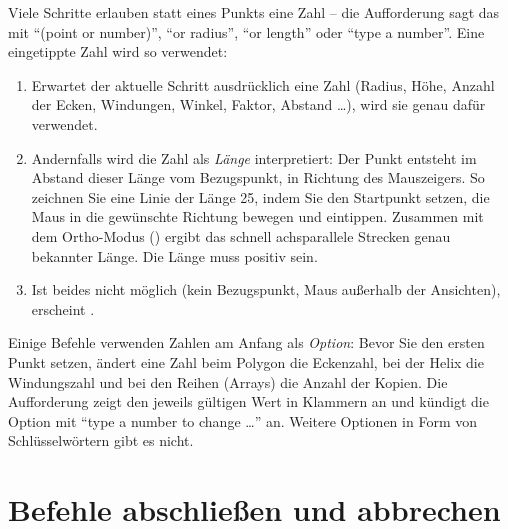 Viele Schritte erlauben statt eines Punkts eine Zahl -- die Aufforderung sagt das mit
\enquote{(point or number)}, \enquote{or radius}, \enquote{or length} oder \enquote{type a
number}. Eine eingetippte Zahl wird so verwendet:

\begin{enumerate}
\item Erwartet der aktuelle Schritt ausdrücklich eine Zahl (Radius, Höhe, Anzahl der Ecken,
  Windungen, Winkel, Faktor, Abstand \ldots), wird sie genau dafür verwendet.
\item Andernfalls wird die Zahl als \emph{Länge} interpretiert: Der Punkt entsteht im Abstand
  dieser Länge vom Bezugspunkt, in Richtung des Mauszeigers. So zeichnen Sie eine Linie der
  Länge 25, indem Sie den Startpunkt setzen, die Maus in die gewünschte Richtung bewegen und
   eintippen. Zusammen mit dem Ortho-Modus () ergibt das schnell achsparallele
  Strecken genau bekannter Länge. Die Länge muss positiv sein.
\item Ist beides nicht möglich (kein Bezugspunkt, Maus außerhalb der Ansichten), erscheint
  .
\end{enumerate}

Einige Befehle verwenden Zahlen am Anfang als \emph{Option}: Bevor Sie den ersten Punkt setzen,
ändert eine Zahl beim Polygon die Eckenzahl, bei der Helix die Windungszahl und bei den Reihen
(Arrays) die Anzahl der Kopien. Die Aufforderung zeigt den jeweils gültigen Wert in Klammern an
und kündigt die Option mit \enquote{type a number to change \ldots} an. Weitere Optionen in
Form von Schlüsselwörtern gibt es nicht.

\section{Befehle abschließen und abbrechen}\label{sec:abschliessen}

